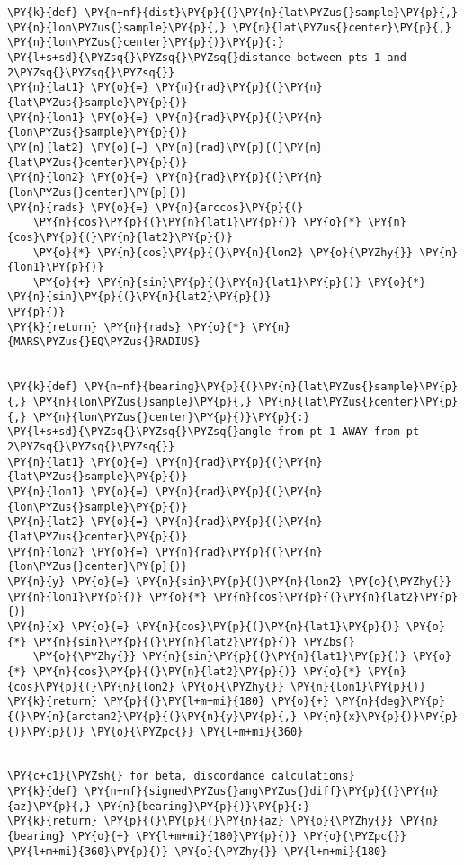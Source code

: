 \begin{tcolorbox}[breakable, size=fbox, boxrule=1pt, pad at break*=1mm,colback=cellbackground, colframe=cellborder]
\begin{Verbatim}[commandchars=\\\{\}]
\PY{k}{def} \PY{n+nf}{dist}\PY{p}{(}\PY{n}{lat\PYZus{}sample}\PY{p}{,} \PY{n}{lon\PYZus{}sample}\PY{p}{,} \PY{n}{lat\PYZus{}center}\PY{p}{,} \PY{n}{lon\PYZus{}center}\PY{p}{)}\PY{p}{:}
\PY{l+s+sd}{\PYZsq{}\PYZsq{}\PYZsq{}distance between pts 1 and 2\PYZsq{}\PYZsq{}\PYZsq{}}
\PY{n}{lat1} \PY{o}{=} \PY{n}{rad}\PY{p}{(}\PY{n}{lat\PYZus{}sample}\PY{p}{)}
\PY{n}{lon1} \PY{o}{=} \PY{n}{rad}\PY{p}{(}\PY{n}{lon\PYZus{}sample}\PY{p}{)}
\PY{n}{lat2} \PY{o}{=} \PY{n}{rad}\PY{p}{(}\PY{n}{lat\PYZus{}center}\PY{p}{)}
\PY{n}{lon2} \PY{o}{=} \PY{n}{rad}\PY{p}{(}\PY{n}{lon\PYZus{}center}\PY{p}{)}
\PY{n}{rads} \PY{o}{=} \PY{n}{arccos}\PY{p}{(}
    \PY{n}{cos}\PY{p}{(}\PY{n}{lat1}\PY{p}{)} \PY{o}{*} \PY{n}{cos}\PY{p}{(}\PY{n}{lat2}\PY{p}{)}
    \PY{o}{*} \PY{n}{cos}\PY{p}{(}\PY{n}{lon2} \PY{o}{\PYZhy{}} \PY{n}{lon1}\PY{p}{)}
    \PY{o}{+} \PY{n}{sin}\PY{p}{(}\PY{n}{lat1}\PY{p}{)} \PY{o}{*} \PY{n}{sin}\PY{p}{(}\PY{n}{lat2}\PY{p}{)}
\PY{p}{)}
\PY{k}{return} \PY{n}{rads} \PY{o}{*} \PY{n}{MARS\PYZus{}EQ\PYZus{}RADIUS}


\PY{k}{def} \PY{n+nf}{bearing}\PY{p}{(}\PY{n}{lat\PYZus{}sample}\PY{p}{,} \PY{n}{lon\PYZus{}sample}\PY{p}{,} \PY{n}{lat\PYZus{}center}\PY{p}{,} \PY{n}{lon\PYZus{}center}\PY{p}{)}\PY{p}{:}
\PY{l+s+sd}{\PYZsq{}\PYZsq{}\PYZsq{}angle from pt 1 AWAY from pt 2\PYZsq{}\PYZsq{}\PYZsq{}}
\PY{n}{lat1} \PY{o}{=} \PY{n}{rad}\PY{p}{(}\PY{n}{lat\PYZus{}sample}\PY{p}{)}
\PY{n}{lon1} \PY{o}{=} \PY{n}{rad}\PY{p}{(}\PY{n}{lon\PYZus{}sample}\PY{p}{)}
\PY{n}{lat2} \PY{o}{=} \PY{n}{rad}\PY{p}{(}\PY{n}{lat\PYZus{}center}\PY{p}{)}
\PY{n}{lon2} \PY{o}{=} \PY{n}{rad}\PY{p}{(}\PY{n}{lon\PYZus{}center}\PY{p}{)}
\PY{n}{y} \PY{o}{=} \PY{n}{sin}\PY{p}{(}\PY{n}{lon2} \PY{o}{\PYZhy{}} \PY{n}{lon1}\PY{p}{)} \PY{o}{*} \PY{n}{cos}\PY{p}{(}\PY{n}{lat2}\PY{p}{)}
\PY{n}{x} \PY{o}{=} \PY{n}{cos}\PY{p}{(}\PY{n}{lat1}\PY{p}{)} \PY{o}{*} \PY{n}{sin}\PY{p}{(}\PY{n}{lat2}\PY{p}{)} \PYZbs{}
    \PY{o}{\PYZhy{}} \PY{n}{sin}\PY{p}{(}\PY{n}{lat1}\PY{p}{)} \PY{o}{*} \PY{n}{cos}\PY{p}{(}\PY{n}{lat2}\PY{p}{)} \PY{o}{*} \PY{n}{cos}\PY{p}{(}\PY{n}{lon2} \PY{o}{\PYZhy{}} \PY{n}{lon1}\PY{p}{)}
\PY{k}{return} \PY{p}{(}\PY{l+m+mi}{180} \PY{o}{+} \PY{n}{deg}\PY{p}{(}\PY{n}{arctan2}\PY{p}{(}\PY{n}{y}\PY{p}{,} \PY{n}{x}\PY{p}{)}\PY{p}{)}\PY{p}{)} \PY{o}{\PYZpc{}} \PY{l+m+mi}{360}


\PY{c+c1}{\PYZsh{} for beta, discordance calculations}
\PY{k}{def} \PY{n+nf}{signed\PYZus{}ang\PYZus{}diff}\PY{p}{(}\PY{n}{az}\PY{p}{,} \PY{n}{bearing}\PY{p}{)}\PY{p}{:}
\PY{k}{return} \PY{p}{(}\PY{p}{(}\PY{n}{az} \PY{o}{\PYZhy{}} \PY{n}{bearing} \PY{o}{+} \PY{l+m+mi}{180}\PY{p}{)} \PY{o}{\PYZpc{}} \PY{l+m+mi}{360}\PY{p}{)} \PY{o}{\PYZhy{}} \PY{l+m+mi}{180}



\end{Verbatim}
\end{tcolorbox}
